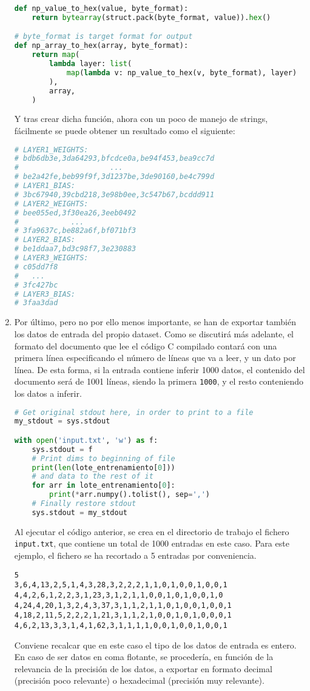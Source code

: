 \begin{enumerate}
\begin{lstlisting}[language=Python]
def np_value_to_hex(value, byte_format):
    return bytearray(struct.pack(byte_format, value)).hex()

# byte_format is target format for output
def np_array_to_hex(array, byte_format):
    return map(
        lambda layer: list(
            map(lambda v: np_value_to_hex(v, byte_format), layer)
        ),
        array,
    )
\end{lstlisting}
    Y tras crear dicha función, ahora con un poco de manejo de strings, fácilmente se puede obtener un resultado como el siguiente:\medskip
\begin{lstlisting}[language=Python]
# LAYER1_WEIGHTS:
# bdb6db3e,3da64293,bfcdce0a,be94f453,bea9cc7d
#                     ...
# be2a42fe,beb99f9f,3d1237be,3de90160,be4c799d
# LAYER1_BIAS:
# 3bc67940,39cbd218,3e98b0ee,3c547b67,bcddd911
# LAYER2_WEIGHTS:
# bee055ed,3f30ea26,3eeb0492
#            ...
# 3fa9637c,be882a6f,bf071bf3
# LAYER2_BIAS:
# be1ddaa7,bd3c98f7,3e230883
# LAYER3_WEIGHTS:
# c05dd7f8
#   ...
# 3fc427bc
# LAYER3_BIAS:
# 3faa3dad
\end{lstlisting}

    \item Por último, pero no por ello menos importante, se han de exportar también los datos de entrada del propio dataset. Como se discutirá más adelante, el formato del documento que lee el código C compilado contará con una primera línea especificando el número de líneas que va a leer, y un dato por línea. De esta forma, si la entrada contiene inferir 1000 datos, el contenido del documento será de 1001 líneas, siendo la primera \texttt{1000}, y el resto conteniendo los datos a inferir.\medskip
\begin{lstlisting}[language=Python]
# Get original stdout here, in order to print to a file
my_stdout = sys.stdout

with open('input.txt', 'w') as f:
    sys.stdout = f
    # Print dims to beginning of file
    print(len(lote_entrenamiento[0]))
    # and data to the rest of it
    for arr in lote_entrenamiento[0]:
        print(*arr.numpy().tolist(), sep=',')
    # Finally restore stdout
    sys.stdout = my_stdout
\end{lstlisting}
    Al ejecutar el código anterior, se crea en el directorio de trabajo el fichero \texttt{input.txt}, que contiene un total de 1000 entradas en este caso. Para este ejemplo, el fichero se ha recortado a 5 entradas por conveniencia.\medskip
\begin{lstlisting}
5
3,6,4,13,2,5,1,4,3,28,3,2,2,2,1,1,0,1,0,0,1,0,0,1
4,4,2,6,1,2,2,3,1,23,3,1,2,1,1,0,0,1,0,1,0,0,1,0
4,24,4,20,1,3,2,4,3,37,3,1,1,2,1,1,0,1,0,0,1,0,0,1
4,18,2,11,5,2,2,2,1,21,3,1,1,2,1,0,0,1,0,1,0,0,0,1
4,6,2,13,3,3,1,4,1,62,3,1,1,1,1,0,0,1,0,0,1,0,0,1
\end{lstlisting}

    Conviene recalcar que en este caso el tipo de los datos de entrada es entero. En caso de ser datos en coma flotante, se procedería, en función de la relevancia de la precisión de los datos, a exportar en formato decimal (precisión poco relevante) o hexadecimal (precisión muy relevante).
\end{enumerate}

